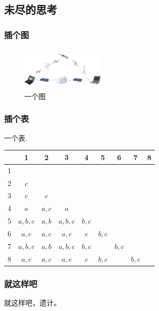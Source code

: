 ﻿\documentclass[CJK,notheorems,mathserif,table]{beamer}
\begin{document}
\begin{CJK*}{GBK}{kai}
\section{未尽的思考}
\begin{frame}\frametitle{插个图}
\begin{figure}[!htbp]
\centering
\includegraphics[width=4.00cm,height=2.10cm]{a.png}
\caption{一个图}
\end{figure}
\end{frame}
\begin{frame}\frametitle{插个表}
一个表.
 \begin{table}
  \centering \addtolength{\tabcolsep}{1mm}
 \begin{tabular}{ccccccccc}
   \hline
        & 1 & 2 & 3 & 4 & 5 & 6 & 7 & 8 \\
   \hline
   1 &         &       &          &       &       &       &       &  \\
   2 & $c$     &       &          &       &       &       &       &  \\
   3 & $c$     & $c $  &          &       &       &       &       &  \\
   4 & $a$     & $a,c$ & $a $     &       &       &       &       &  \\
   5 & $a,b,c$ & $a,b$ & $a,b,c$  & $b,c$ &       &       &       &  \\
   6 & $a,c$   & $a,c$ & $a,c$    & $c $  & $b,c$ &       &       &  \\
   7 & $a,b,c$ & $a,b$ & $a,b,c$  & $b,c$ &       & $b,c$ &       &  \\
   8 & $a,c$   & $a,c$ & $a,c$    & $c$   & $b,c$ &       & $b,c$ &  \\
   \hline
 \end{tabular}\label{dismatrix}
 \end{table}
\end{frame}
\begin{frame}\frametitle{就这样吧}
就这样吧，遗计。
\end{frame}

\end{CJK*}
\end{document}
